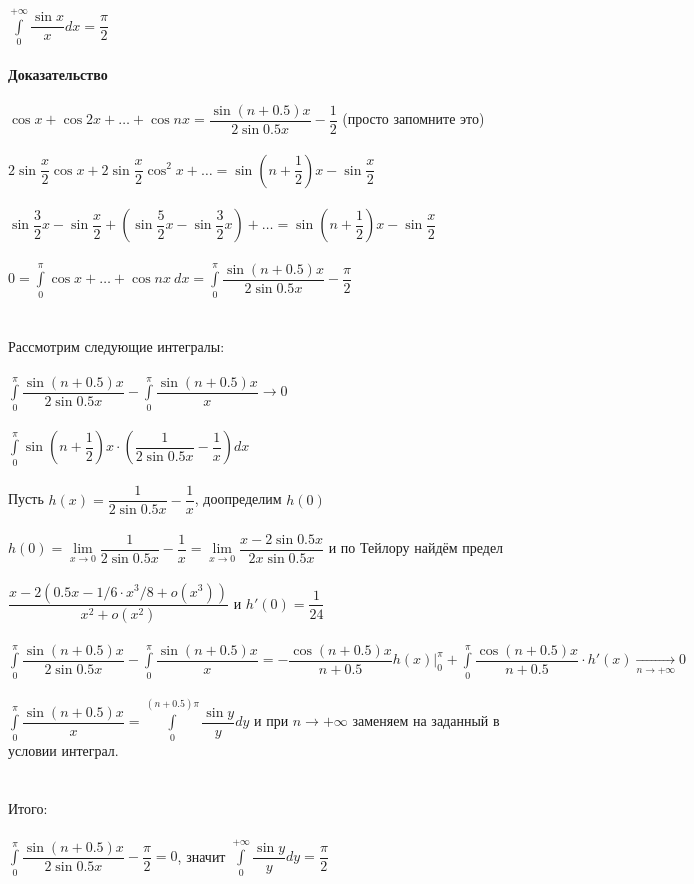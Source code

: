 \documentclass[../main.tex]{subfiles}
\begin{document}
$\int\limits^{+\infty}_0 \dfrac{\sin{x}}{x} dx = \dfrac{\pi}{2}$\\\\
\textbf{Доказательство}\\\\
$\cos{x} + \cos{2x} + \ldots + \cos{nx} = \dfrac{\sin{(n + 0.5)} x}{2 \sin{0.5 x}} - \dfrac{1}{2}$ (просто запомните это)\\\\
$2 \sin {\dfrac{x}{2}} \cos{x} + 2 \sin{\dfrac{x}{2}} \cos^2{x} + \ldots = \sin{\left(n + \dfrac{1}{2} \right)}x - \sin{\dfrac{x}{2}}$\\\\
$\sin {\dfrac{3}{2}x} - \sin {\dfrac{x}{2}} + \left( \sin {\dfrac{5}{2}} x - \sin {\dfrac{3}{2}} x \right) + \ldots = \sin {\left(n + \dfrac{1}{2} \right)x} - \sin {\dfrac{x}{2}}$\\\\
$0 = \int\limits^{\pi}_0 \cos{x} + \ldots + \cos{nx} \ dx = \int\limits^{\pi}_0 \dfrac{\sin {(n + 0.5)} x}{2 \sin {0.5 x}} - \dfrac{\pi}{2}$\\\\\\
Рассмотрим следующие интегралы:\\\\
$\int\limits^{\pi}_0 \dfrac{\sin{(n + 0.5)}x}{2 \sin {0.5 x}} - \int\limits^{\pi}_0 \dfrac{\sin {(n + 0.5)}x}{x} \rightarrow 0$\\\\
$\int\limits^{\pi}_0 \sin \left(n + \dfrac{1}{2} \right) x \cdot \left( \dfrac{1}{2 \sin {0.5 x}} - \dfrac{1}{x} \right) dx$\\\\
Пусть $h(x) = \dfrac{1}{2 \sin {0.5 x}} - \dfrac{1}{x}$, доопределим $h(0)$\\\\
$h(0) = \lim\limits_{x \rightarrow 0} \dfrac{1}{2 \sin {0.5x}} - \dfrac{1}{x} = \lim\limits_{x \rightarrow 0} \dfrac{x - 2 \sin {0.5 x}}{2 x \sin {0.5 x}}$ и по Тейлору найдём предел\\\\
$\dfrac{x - 2 \left(0.5 x - 1/6 \cdot x^3/8 + o(x^3) \right)}{x^2 + o(x^2)}$ и $h'(0) = \dfrac{1}{24}$\\\\
$\int\limits^{\pi}_0 \dfrac{\sin{(n + 0.5)x}}{2 \sin{0.5 x}} - \int\limits^{\pi}_0 \dfrac{\sin {(n + 0.5)x}}{x} = - \dfrac{\cos {(n + 0.5)x}}{n + 0.5} h(x) \bigg|^{\pi}_0 + \int\limits^{\pi}_0 \dfrac{\cos{(n + 0.5)}x}{n + 0.5} \cdot h'(x) \xrightarrow[n \rightarrow +\infty]{} 0$\\\\
$\int\limits^{\pi}_0 \dfrac{\sin{(n + 0.5)}x}{x} = \int\limits^{(n + 0.5) \pi}_0 \dfrac{\sin{y}}{y} dy$ и при $n \rightarrow +\infty$ заменяем на заданный в условии интеграл. \\\\\\
Итого:\\\\
$\int\limits^{\pi}_0 \dfrac{\sin {(n + 0.5)x}}{2 \sin 0.5 x} - \dfrac{\pi}{2} = 0$, значит $\int\limits^{+\infty}_0 \dfrac{\sin{y}}{y} dy = \dfrac{\pi}{2}$
\end{document}
